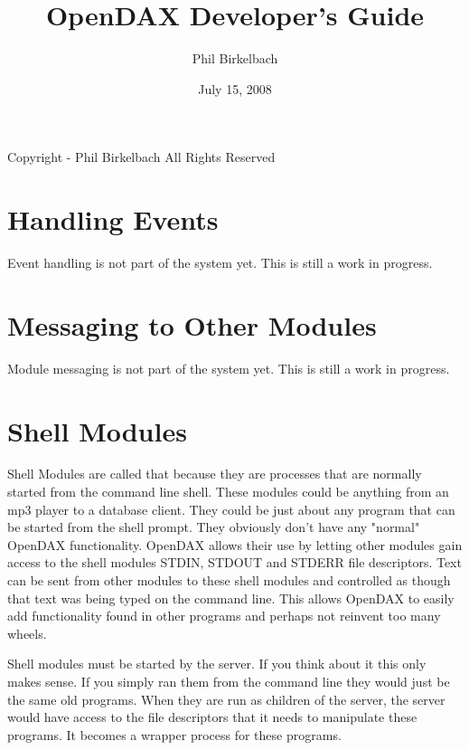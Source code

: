 

\title{OpenDAX Developer's Guide}
\date{July 15, 2008}
\author{Phil Birkelbach}


\maketitle
\begin{flushleft}
Copyright  - Phil Birkelbach\linebreak
All Rights Reserved

\end{flushleft}

\tableofcontents
\newpage
{}





\chapter{Handling Events}

Event handling is not part of the system yet.  This is still a work in progress.

\chapter{Messaging to Other Modules}

Module messaging is not part of the system yet.  This is still a work in progress.

\chapter{Shell Modules}

Shell Modules are called that because they are processes that are normally started from the command line shell.  These modules could be anything from an mp3 player to a database client.  They could be just about any program that can be started from the shell prompt.  They obviously don't have any "normal" OpenDAX functionality.  OpenDAX allows their use by letting other modules gain access to the shell modules STDIN, STDOUT and STDERR file descriptors.  Text can be sent from other modules to these shell modules and controlled as though that text was being typed on the command line.  This allows OpenDAX to easily add functionality found in other programs and perhaps not reinvent too many wheels.

Shell modules must be started by the \opendax server.  If you think about it this only makes sense.  If you simply ran them from the command line they would just be the same old programs.  When they are run as children of the \opendax server, the server would have access to the file descriptors that it needs to manipulate these programs.  It becomes a wrapper process for these programs.


